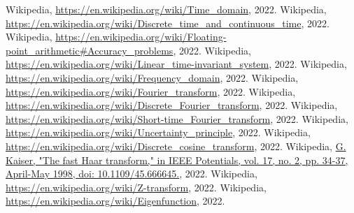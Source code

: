 \clearpage
{}
\begin{thebibliography}{9}
         Wikipedia, \underline{https://en.wikipedia.org/wiki/Time\_domain}, 2022.
         Wikipedia, \underline{https://en.wikipedia.org/wiki/Discrete\_time\_and\_continuous\_time}, 2022.
         Wikipedia, \underline{https://en.wikipedia.org/wiki/Floating-point\_arithmetic\#Accuracy\_problems}, 2022.
         Wikipedia, \underline{https://en.wikipedia.org/wiki/Linear\_time-invariant\_system}, 2022.
         Wikipedia, \underline{https://en.wikipedia.org/wiki/Frequency\_domain}, 2022.
         Wikipedia, \underline{https://en.wikipedia.org/wiki/Fourier\_transform}, 2022.
         Wikipedia, \underline{https://en.wikipedia.org/wiki/Discrete\_Fourier\_transform}, 2022.
         Wikipedia, \underline{https://en.wikipedia.org/wiki/Short-time\_Fourier\_transform}, 2022.
         Wikipedia, \underline{https://en.wikipedia.org/wiki/Uncertainty\_principle}, 2022.
         Wikipedia, \underline{https://en.wikipedia.org/wiki/Discrete\_cosine\_transform}, 2022.
         Wikipedia, \underline{G. Kaiser, "The fast Haar transform," in IEEE Potentials, vol. 17, no. 2, pp. 34-37, April-May 1998, doi: 10.1109/45.666645.}, 2022.
         Wikipedia, \underline{https://en.wikipedia.org/wiki/Z-transform}, 2022.
         Wikipedia, \underline{https://en.wikipedia.org/wiki/Eigenfunction}, 2022.
\end{thebibliography}

